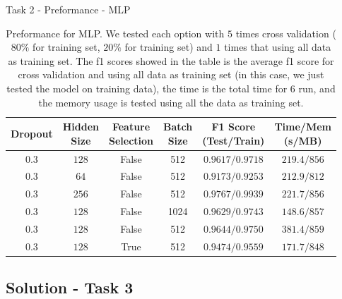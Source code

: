\documentclass{beamer}
\begin{document}
\begin{frame}{Task 2 - Preformance - MLP}

  \begin{table}[H]
    \centering
    \begin{tabular}{|c|c|c|c|c|c|}
      \hline
      Dropout & \makecell{Hidden                                                \\ Size} & \makecell{Feature                                        \\ Selection} &\makecell{Batch \\ Size} & \makecell{F1 Score \\ (Test/Train)} & \makecell{Time/Mem \\ (s/MB)} \\
      \hline
      $0.3$   & $128$            & False & 512  & $0.9617/0.9718$ & $219.4/856$ \\
      \hline
      $0.3$   & $64$             & False & 512  & $0.9173/0.9253$ & $212.9/812$ \\
      \hline
      $0.3$   & $256$            & False & 512  & $0.9767/0.9939$ & $221.7/856$ \\
      \hline
      $0.3$   & $128$            & False & 1024 & $0.9629/0.9743$ & $148.6/857$ \\
      \hline
      $0.3$   & $128$            & False & 512  & $0.9644/0.9750$ & $381.4/859$ \\
      \hline
      $0.3$   & $128$            & True  & 512  & $0.9474/0.9559$ & $171.7/848$ \\
      \hline
    \end{tabular}
    \caption{Preformance for MLP. We tested each option with $5$ times cross validation ($80\%$ for training set, $20\%$ for training set) and $1$ times that using all data as training set. The f1 scores showed in the table is the average f1 score for cross validation and using all data as training set (in this case, we just tested the model on training data), the time is the total time for $6$ run, and the memory usage is tested using all the data as training set.}
  \end{table}

\end{frame}

\subsection{Solution - Task 3}
\end{document}
